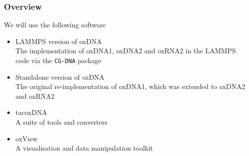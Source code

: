\documentclass[slidestop,compress,9pt]{beamer}
\begin{document}
\begin{frame}
\frametitle{Overview}

We will use the following software\\[10pt]

\begin{itemize}
\setlength\itemsep{10pt}
\item LAMMPS version of oxDNA\\
The implementation of oxDNA1, oxDNA2 and oxRNA2 in the LAMMPS code via the \texttt{CG-DNA} package 
\item Standalone version of oxDNA\\
The original re-implementation of oxDNA1, which was extended to oxDNA2 and oxRNA2
\item tacoxDNA\\
A suite of tools and converters
\item oxView\\
A visualisation and data manipulation toolkit
\end{itemize}

\end{frame}
\end{document}
